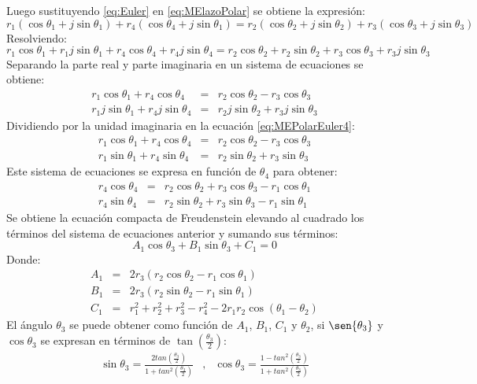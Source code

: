 Luego sustituyendo \ref{eq:Euler} en \ref{eq:MElazoPolar} se obtiene la expresión:
\begin{equation}\label{eq:MEPolarEuler}
r_1(\cos{\theta_1}+j\sin{\theta_1})+r_4(\cos{\theta_4}+j\sin{\theta_1})=r_2(\cos{\theta_2}+j\sin{\theta_2})+r_3(\cos{\theta_3}+j\sin{\theta_3})
\end{equation}
Resolviendo:
\begin{equation}\label{eq:MEPolarEuler2}
r_1 \cos{\theta_1}+r_1 j \sin{\theta_1}+r_4\cos{\theta_4}+r_4j\sin{\theta_4}=r_2\cos{\theta_2}+r_2\sin{\theta_2}+r_3\cos{\theta_3}+r_3j\sin{\theta_3}
\end{equation}
Separando la parte real y parte imaginaria en un sistema de ecuaciones se obtiene:
\begin{eqnarray}
r_1 \cos{\theta_1}+r_4\cos{\theta_4}&=&r_2\cos{\theta_2} -r_3\cos{\theta_3} \label{eq:MEPolarEuler4} \\
r_1j\sin{\theta_1}+r_4j\sin{\theta_4} &=&r_2j\sin{\theta_2}+r_3j\sin{\theta_3}\label{eq:MEPolarEuler3}
\end{eqnarray}
Dividiendo por la unidad imaginaria en la ecuación \ref{eq:MEPolarEuler4}: 
\begin{eqnarray}
r_1 \cos{\theta_1}+r_4\cos{\theta_4}&=&r_2\cos{\theta_2} -r_3\cos{\theta_3} \label{eq:MEPolarEuler4} \\
r_1\sin{\theta_1}+r_4\sin{\theta_4} &=&r_2\sin{\theta_2}+r_3\sin{\theta_3}\label{eq:MEPolarEuler3}
\end{eqnarray}
Este sistema de ecuaciones se expresa en función de $\theta_4$ para obtener:
\begin{eqnarray}
r_4\cos{\theta_4}&=&r_2\cos{\theta_2} +r_3\cos{\theta_3}-r_1 \cos{\theta_1}\label{eq:MEPolarEuler5} \\
r_4\sin{\theta_4} &=&r_2\sin{\theta_2}+r_3\sin{\theta_3}-r_1\sin{\theta_1}\label{eq:MEPolarEuler6}
\end{eqnarray}
Se obtiene la ecuación compacta de Freudenstein elevando al cuadrado los términos
del sistema de ecuaciones anterior y sumando sus términos:
\begin{equation} \label{eq:A1B1C1}
 A_1\cos{\theta_3}+B_1\sin{\theta_3}+C_1=0 
\end{equation}
Donde:
\begin{eqnarray}
A_1&=& 2r_3(r_2\cos{\theta_2}-r_1\cos{\theta_1}) \label{eq:A1} \\
B_1&=& 2r_3(r_2\sin{\theta_2}-r_1\sin{\theta_1}) \label{eq:B1} \\
C_1&=& r_1^2+r_2^2+r_3^2-r_4^2 -2r_1r_2\cos(\theta_1-\theta_2) \label{eq:C1}
\end{eqnarray}
El ángulo $\theta_3$ se puede obtener como función de $A_1$, $B_1$, $C_1$ y $\theta_2$, si $\sen{\theta_3}$ y $\cos{\theta_3}$  se expresan en términos de $\tan(\frac{\theta_3}{2})$:
\begin{eqnarray}
\sin{\theta_3}= \frac{2tan(\frac{\theta_3}{2})}{1+tan^2(\frac{\theta_3}{2})}&,& \cos{\theta_3}= \frac{1-tan^2(\frac{\theta_3}{2})}{1+tan^2(\frac{\theta_3}{2})} \label{eq:enFuncionTheta3}
\end{eqnarray}


